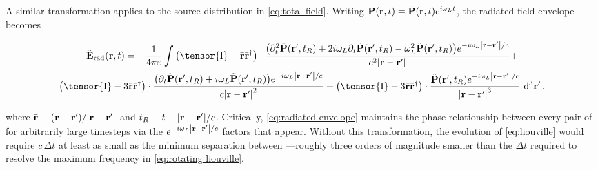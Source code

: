 A similar transformation applies to the source distribution in \cref{eq:total field}.
Writing $\vb{P}(\vb{r}, t) = \tilde{\vb{P}}(\vb{r}, t)e^{i \omega_L t}$, the radiated field envelope becomes
\begin{widetext}
\begin{equation}
  \begin{gathered}
    \tilde{\vb{E}}_\text{rad}(\vb{r}, t) = -\frac{1}{4\pi \varepsilon} \int
    \qty(\tensor{\mathrm{I}} -  \bar{\vb{r}}\bar{\vb{r}}^\dagger) \cdot \frac{\qty(\partial_t^2 \tilde{\vb{P}}(\vb{r}', t_R) + 2 i \omega_L \partial_t \tilde{\vb{P}}(\vb{r}', t_R) - \omega_L^2 \tilde{\vb{P}}(\vb{r}', t_R)) e^{-i \omega_L \abs{\vb{r} - \vb{r}'}/c}}{c^2 \abs{\vb{r}-\vb{r}'}} + \\
    \qty(\tensor{\mathrm{I}} - 3\bar{\vb{r}}\bar{\vb{r}}^\dagger) \cdot \frac{\qty(\partial_t \tilde{\vb{P}}(\vb{r}', t_R) + i \omega_L \tilde{\vb{P}}(\vb{r}', t_R))e^{-i \omega_L \abs{\vb{r} - \vb{r}'}/c}}{c \abs{\vb{r}-\vb{r}'}^2} +
    \qty(\tensor{\mathrm{I}} - 3\bar{\vb{r}}\bar{\vb{r}}^\dagger) \cdot \frac{                \tilde{\vb{P}}(\vb{r}', t_R) e^{-i \omega_L \abs{\vb{r} - \vb{r}'}/c}}{\abs{\vb{r}-\vb{r}'}^3}
    \, \dd[3]{\vb{r'}}.
  \end{gathered}
  \label{eq:radiated envelope}
\end{equation}
\end{widetext}
where $\bar{\vb{r}} \equiv \qty(\vb{r} - \vb{r}')/\abs{\vb{r} - \vb{r}'}$ and $t_R \equiv t - \abs{\vb{r} - \vb{r}'}/c$.
Critically, \cref{eq:radiated envelope} maintains the phase relationship between every pair of \qds{} for arbitrarily large timesteps via the $e^{-i \omega_L \abs{\vb{r} - \vb{r}'}/c}$ factors that appear.
Without this transformation, the evolution of \cref{eq:liouville} would require $c \, \Delta t$ at least as small as the minimum separation between \qds{}---roughly three orders of magnitude smaller than the $\Delta t$ required to resolve the maximum frequency in \cref{eq:rotating liouville}.



